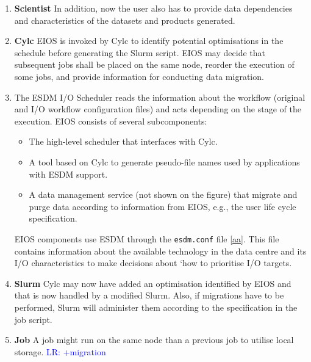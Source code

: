 \documentclass{superfri}
\newcommand{\lr}[1]{\textcolor{blue}{LR: #1}}
\begin{document}
\begin{enumerate}

  \item \textbf{Scientist} In addition, now the user also has to provide data dependencies and characteristics of the datasets and products generated.

  \item \textbf{Cylc} EIOS is invoked by Cylc to identify potential optimisations in the schedule before generating the Slurm script.
  EIOS may decide that subsequent jobs shall be placed on the same node, reorder the execution of some jobs, and provide information for conducting data migration.

  \item \textbf{\color{red}{EIOS}} The ESDM I/O Scheduler reads the information about the workflow (original and I/O workflow configuration files) and acts depending on the stage of the execution.
  EIOS consists of several subcomponents:
    \begin{itemize}

      \item The high-level scheduler that interfaces with Cylc.\\

      \item A tool based on Cylc to generate pseudo-file names used by applications with ESDM support.\\

      \item A data management service (not shown on the figure) that migrate and purge data according to information from EIOS, e.g., the user life cycle specification.\\

    \end{itemize}
  EIOS components use ESDM through the \texttt{esdm.conf} file \ref{aa}. This file contains information about the available technology in the data centre and its I/O characteristics to make decisions about `how to prioritise I/O targets.

  \item \textbf{Slurm}
  Cylc may now have added an optimisation identified by EIOS and that is now handled by a modified Slurm.
  Also, if migrations have to be performed, Slurm will administer them according to the specification in the job script.

  \item \textbf{Job}
  A job might run on the same node than a previous job to utilise local storage. \lr{+migration}


\end{enumerate}
\end{document}
